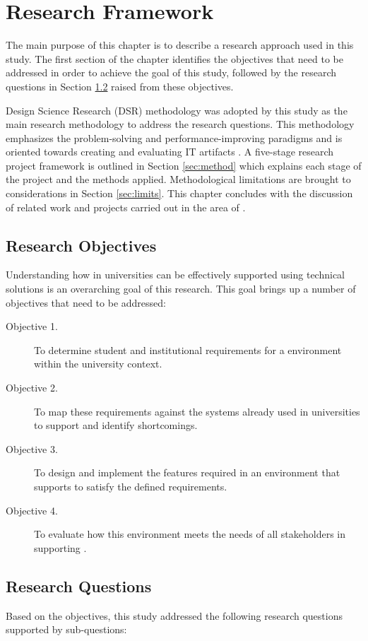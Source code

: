 \chapter{Research Framework\label{cha:method}}
The main purpose of this chapter is to describe a research approach used in this
study. The first section of the chapter identifies the objectives that need to
be addressed in order to achieve the goal of this study, followed by the research
questions in Section \ref{sec:questions} raised from these objectives.

Design Science Research (DSR) methodology was adopted by this study as the main
research methodology to address the research questions. This methodology
emphasizes the problem-solving and performance-improving paradigms and is
oriented towards creating and evaluating IT artifacts \citep{Hevner2004}. A
five-stage research project framework is outlined in Section \ref{sec:method}
which explains each stage of the project and the methods applied. Methodological
limitations are brought to considerations in Section \ref{sec:limits}. This
chapter concludes with the discussion of related work and projects carried out
in the area of \LLLsn.

\section{Research Objectives}

Understanding how \LLLs in universities can be effectively supported using
technical solutions is an overarching goal of this research. This goal brings up
a number of objectives that need to be addressed:
\begin{description}
  \item[Objective 1.] To determine student and institutional requirements for a
  \LLLs environment within the university context.
  \item[Objective 2.] To map these requirements against the systems already used
  in universities to support \LLLs and identify shortcomings.
  \item[Objective 3.] To design and implement the features required in an
  environment that supports \LLLs to satisfy the defined requirements.
  \item[Objective 4.] To evaluate how this environment meets the needs of all
  stakeholders in supporting \LLLsn.
\end{description}

\section{Research Questions}
\label{sec:questions}
Based on the objectives, this study addressed the following research questions
supported by sub-questions:

